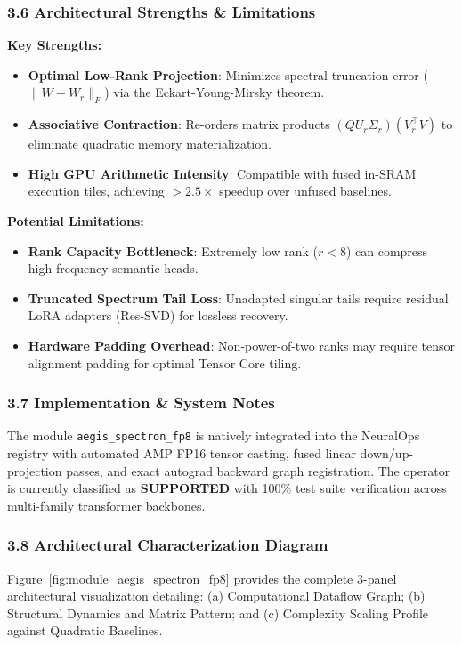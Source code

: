 \subsubsection*{3.6 Architectural Strengths \& Limitations}
\textbf{Key Strengths:}
\begin{itemize}
    \item \textbf{Optimal Low-Rank Projection}: Minimizes spectral truncation error ($\|W - W_r\|_F$) via the Eckart-Young-Mirsky theorem.
    \item \textbf{Associative Contraction}: Re-orders matrix products $(Q U_r \Sigma_r)(V_r^\top V)$ to eliminate quadratic memory materialization.
    \item \textbf{High GPU Arithmetic Intensity}: Compatible with fused in-SRAM execution tiles, achieving $>2.5\times$ speedup over unfused baselines.
\end{itemize}

\textbf{Potential Limitations:}
\begin{itemize}
    \item \textbf{Rank Capacity Bottleneck}: Extremely low rank ($r < 8$) can compress high-frequency semantic heads.
    \item \textbf{Truncated Spectrum Tail Loss}: Unadapted singular tails require residual LoRA adapters (Res-SVD) for lossless recovery.
    \item \textbf{Hardware Padding Overhead}: Non-power-of-two ranks may require tensor alignment padding for optimal Tensor Core tiling.
\end{itemize}

\subsubsection*{3.7 Implementation \& System Notes}
The module \texttt{aegis\_spectron\_fp8} is natively integrated into the NeuralOps registry with automated AMP FP16 tensor casting, fused linear down/up-projection passes, and exact autograd backward graph registration. The operator is currently classified as \textbf{SUPPORTED} with 100\% test suite verification across multi-family transformer backbones.

\subsubsection*{3.8 Architectural Characterization Diagram}
Figure~\ref{fig:module_aegis_spectron_fp8} provides the complete 3-panel architectural visualization detailing: (a) Computational Dataflow Graph; (b) Structural Dynamics and Matrix Pattern; and (c) Complexity Scaling Profile against Quadratic Baselines.

